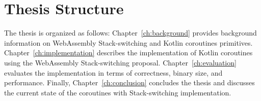 \section{Thesis Structure}
\label{sec:structure}

The thesis is organized as follows: Chapter~\ref{ch:background} provides background information on WebAssembly
Stack-switching and Kotlin coroutines primitives. Chapter~\ref{ch:implementation} describes the implementation of
Kotlin coroutines using the WebAssembly Stack-switching proposal. Chapter~\ref{ch:evaluation} evaluates the
implementation in terms of correctness, binary size, and performance. Finally, Chapter~\ref{ch:conclusion} concludes the thesis and
discusses the current state of the coroutines with Stack-switching implementation.
